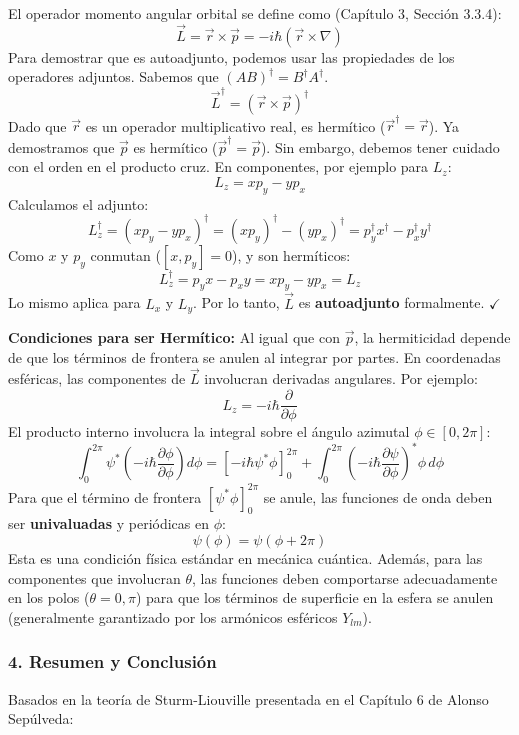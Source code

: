 \documentclass[a4paper]{article}
\begin{document}
El operador momento angular orbital se define como (Capítulo 3, Sección 3.3.4):
$$
\vec{L} = \vec{r} \times \vec{p} = -i\hbar (\vec{r} \times \nabla)
$$
Para demostrar que es autoadjunto, podemos usar las propiedades de los operadores adjuntos. Sabemos que $(AB)^\dagger = B^\dagger A^\dagger$.
$$
\vec{L}^\dagger = (\vec{r} \times \vec{p})^\dagger
$$
Dado que $\vec{r}$ es un operador multiplicativo real, es hermítico ($\vec{r}^\dagger = \vec{r}$). Ya demostramos que $\vec{p}$ es hermítico ($\vec{p}^\dagger = \vec{p}$). Sin embargo, debemos tener cuidado con el orden en el producto cruz. En componentes, por ejemplo para $L_z$:
$$
L_z = x p_y - y p_x
$$
Calculamos el adjunto:
$$
L_z^\dagger = (x p_y - y p_x)^\dagger = (x p_y)^\dagger - (y p_x)^\dagger = p_y^\dagger x^\dagger - p_x^\dagger y^\dagger
$$
Como $x$ y $p_y$ conmutan ($[x, p_y] = 0$), y son hermíticos:
$$
L_z^\dagger = p_y x - p_x y = x p_y - y p_x = L_z
$$
Lo mismo aplica para $L_x$ y $L_y$. Por lo tanto, $\vec{L}$ es \textbf{autoadjunto} formalmente. $\checkmark$

\textbf{Condiciones para ser Hermítico:}
Al igual que con $\vec{p}$, la hermiticidad depende de que los términos de frontera se anulen al integrar por partes. En coordenadas esféricas, las componentes de $\vec{L}$ involucran derivadas angulares. Por ejemplo:
$$
L_z = -i\hbar \frac{\partial}{\partial \phi}
$$
El producto interno involucra la integral sobre el ángulo azimutal $\phi \in [0, 2\pi]$:
$$
\int_0^{2\pi} \psi^* \left( -i\hbar \frac{\partial \phi}{\partial \phi} \right) d\phi = \left[ -i\hbar \psi^* \phi \right]_0^{2\pi} + \int_0^{2\pi} \left( -i\hbar \frac{\partial \psi}{\partial \phi} \right)^* \phi \, d\phi
$$
Para que el término de frontera $\left[ \psi^* \phi \right]_0^{2\pi}$ se anule, las funciones de onda deben ser \textbf{univaluadas} y periódicas en $\phi$:
$$
\psi(\phi) = \psi(\phi + 2\pi)
$$
Esta es una condición física estándar en mecánica cuántica. Además, para las componentes que involucran $\theta$, las funciones deben comportarse adecuadamente en los polos ($\theta = 0, \pi$) para que los términos de superficie en la esfera se anulen (generalmente garantizado por los armónicos esféricos $Y_{lm}$).

\subsubsection{4. Resumen y Conclusión}

Basados en la teoría de Sturm-Liouville presentada en el Capítulo 6 de Alonso Sepúlveda:
\end{document}
